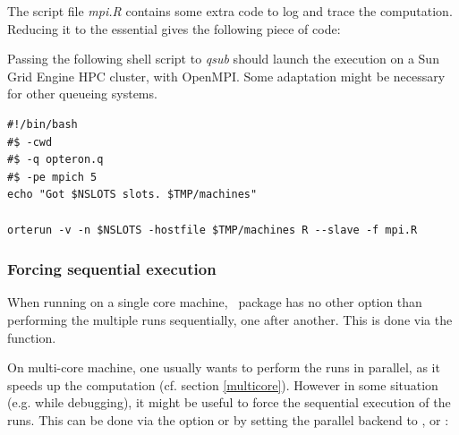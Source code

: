 \documentclass[a4paper]{article}
\newcommand{\nmfpack}{\code{NMF}\ }
\begin{document}
The script file \emph{mpi.R} contains some extra code to log and trace the 
computation. Reducing it to the essential gives the following piece of code:

\begin{Schunk}
\end{Schunk}

Passing the following shell script to \emph{qsub} should launch the 
execution on a Sun Grid Engine HPC cluster, with OpenMPI.
Some adaptation might be necessary for other queueing systems.

\begin{shaded}
\small
\begin{verbatim}
#!/bin/bash
#$ -cwd 
#$ -q opteron.q
#$ -pe mpich 5
echo "Got $NSLOTS slots. $TMP/machines"

orterun -v -n $NSLOTS -hostfile $TMP/machines R --slave -f mpi.R
\end{verbatim}
\end{shaded}

\subsubsection{Forcing sequential execution}
When running on a single core machine, \nmfpack package has no other option than 
performing the multiple runs sequentially, one after another. 
This is done via the  function.

On multi-core machine, one usually wants to perform the runs in parallel, as it 
speeds up the computation (cf. section \ref{multicore}).
However in some situation (e.g. while debugging), it might be useful to force the 
sequential execution of the runs. This can be done via the option  or 
by setting the parallel backend to ,  or :
\end{document}
